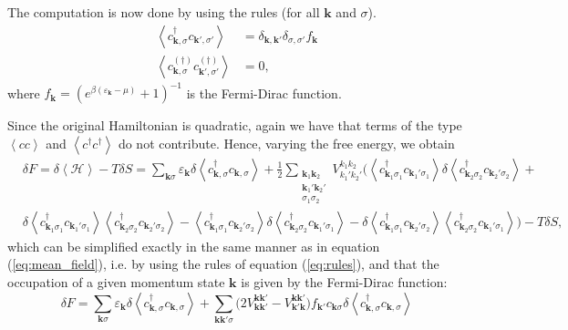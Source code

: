 The computation is now done by using the rules (for all $\bm k$ and $\sigma$).
\begin{equation}\label{eq:rules}
\begin{split}
\left\langle c_{\bm k, \sigma}^\dagger c_{\bm k', \sigma'} \right\rangle &= \delta_{\bm k, \bm k'} \delta_{\sigma, \sigma'} f_{\bm k} \\
\left\langle c_{\bm k, \sigma}^{(\dagger)} c_{\bm k', \sigma'}^{(\dagger)} \right\rangle &= 0 ,
\end{split}
\end{equation}
where $f_{\bm k} = (e^{\beta(\varepsilon_{\bm k} - \mu)} +1 )^{-1}$ is the Fermi-Dirac function.

Since the original Hamiltonian is quadratic, again we have that terms of the type $\left\langle cc \right\rangle$ and $\left\langle c^\dagger c^\dagger \right\rangle$ do not contribute. Hence, varying the free energy, we obtain
\begin{equation}
\begin{split}
&\delta F =  \delta \left\langle \mathcal{H} \right\rangle - T \delta S = \sum_{\bm k \sigma} \varepsilon_{\bm k} \delta \left\langle c_{\bm k, \sigma}^\dagger c_{\bm k, \sigma} \right\rangle + \frac{1}{2} \sum_{\substack{\bm k_1 \bm k_2 \\ \bm k_1' \bm k_2' \\  \sigma_1 \sigma_2}} V_{k_1' k_2'}^{k_1 k_2} \bigg( \left\langle c_{\bm k_1 \sigma_1}^\dagger c_{\bm k_1' \sigma_1} \right\rangle \delta  \left\langle c_{\bm k_2 \sigma_2}^\dagger c_{\bm k_2' \sigma_2} \right\rangle + \\
&\delta \left\langle c_{\bm k_1 \sigma_1}^\dagger c_{\bm k_1' \sigma_1} \right\rangle  \left\langle c_{\bm k_2 \sigma_2}^\dagger c_{\bm k_2' \sigma_2} \right\rangle  - \left\langle c_{\bm k_1 \sigma_1}^\dagger c_{\bm k_2' \sigma_2} \right\rangle  \delta \left\langle c_{\bm k_2 \sigma_2}^\dagger c_{\bm k_1' \sigma_1} \right\rangle - \delta \left\langle c_{\bm k_1 \sigma_1}^\dagger c_{\bm k_2' \sigma_2} \right\rangle  \left\langle c_{\bm k_2 \sigma_2}^\dagger c_{\bm k_1' \sigma_1} \right\rangle \bigg) - T \delta S ,
\end{split}
\end{equation}
which can be simplified exactly in the same manner as in equation (\ref{eq:mean_field}), i.e. by using the rules of equation (\ref{eq:rules}), and that the occupation of a given momentum state $\bm k$ is given by the Fermi-Dirac function:
\begin{equation}
\delta F = \sum_{\bm k \sigma} \varepsilon_{\bm k} \delta \left\langle c_{\bm k, \sigma}^\dagger c_{\bm k, \sigma} \right\rangle + \sum_{\bm k \bm k' \sigma} \bigg( 2 V_{\bm k \bm k'}^{\bm k \bm k'} -  V_{\bm k' \bm k}^{\bm k \bm k'}  \bigg) f_{\bm k'} c_{\bm k \sigma} \delta \left\langle c_{\bm k, \sigma}^\dagger c_{\bm k, \sigma} \right\rangle
\end{equation}

